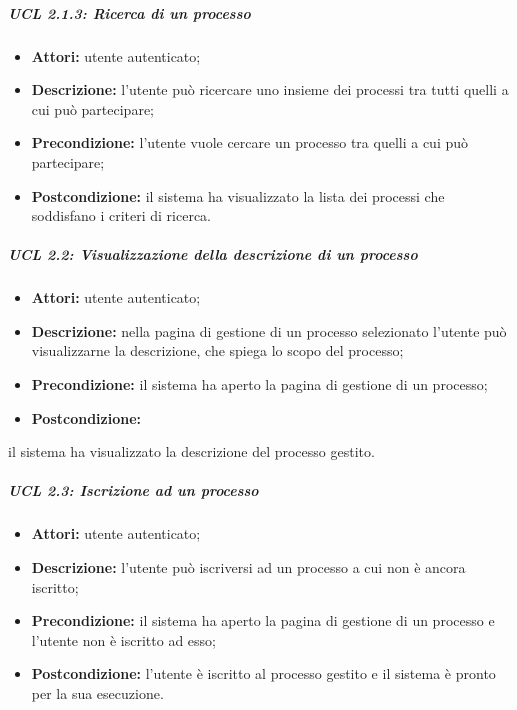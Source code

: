 \subparagraph{UCL 2.1.3: Ricerca di un processo}
\begin{itemize}
\item \textbf{Attori:} utente autenticato;
\item \textbf{Descrizione:} l'utente può ricercare uno insieme dei processi tra tutti quelli a cui può partecipare;
\item \textbf{Precondizione:} l'utente vuole cercare un processo tra quelli a cui può partecipare;
\item \textbf{Postcondizione:} il sistema ha visualizzato la lista dei processi che soddisfano i criteri di ricerca.
\end{itemize}

\subparagraph{UCL 2.2: Visualizzazione della descrizione di un processo}
\begin{itemize}
\item \textbf{Attori:} utente autenticato;
\item \textbf{Descrizione:} nella pagina di gestione di un processo selezionato l'utente può visualizzarne la descrizione, che spiega lo scopo del processo;
\item \textbf{Precondizione:} il sistema ha aperto la pagina di gestione di un processo;
\item \textbf{Postcondizione:}
\end{itemize} il sistema ha visualizzato la descrizione del processo gestito.

\subparagraph{UCL 2.3: Iscrizione ad un processo}
\begin{itemize}
\item \textbf{Attori:} utente autenticato;
\item \textbf{Descrizione:} l'utente può iscriversi ad un processo a cui non è ancora iscritto;
\item \textbf{Precondizione:} il sistema ha aperto la pagina di gestione di un processo e l'utente non è iscritto ad esso;
\item \textbf{Postcondizione:} l'utente è iscritto al processo gestito e il sistema è pronto per la sua esecuzione.
\end{itemize}

